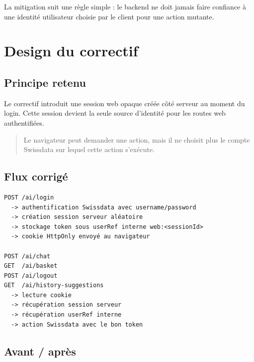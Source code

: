\documentclass[11pt,a4paper]{article}
\begin{document}
La mitigation suit une règle simple : le backend ne doit jamais faire confiance
à une identité utilisateur choisie par le client pour une action mutante.

\section{Design du correctif}

\subsection{Principe retenu}

Le correctif introduit une session web opaque créée côté serveur au moment du
login. Cette session devient la seule source d'identité pour les routes web
authentifiées.

\begin{quote}
Le navigateur peut demander une action, mais il ne choisit plus le compte
Swissdata sur lequel cette action s'exécute.
\end{quote}

\subsection{Flux corrigé}

\begin{verbatim}
POST /ai/login
  -> authentification Swissdata avec username/password
  -> création session serveur aléatoire
  -> stockage token sous userRef interne web:<sessionId>
  -> cookie HttpOnly envoyé au navigateur

POST /ai/chat
GET  /ai/basket
POST /ai/logout
GET  /ai/history-suggestions
  -> lecture cookie
  -> récupération session serveur
  -> récupération userRef interne
  -> action Swissdata avec le bon token
\end{verbatim}

\subsection{Avant / après}
\end{document}
